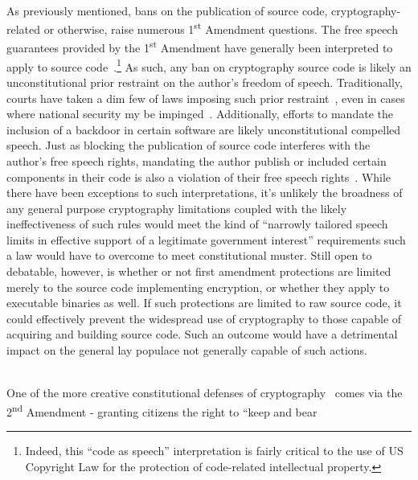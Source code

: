 \begin{packed_desc}
\item[1\textsuperscript{st} Amendment] \hfill \\ As previously
  mentioned, bans on the publication of source code,
  cryptography-related or otherwise, raise numerous
  1\textsuperscript{st} Amendment questions. The free speech
  guarantees provided by the 1\textsuperscript{st} Amendment have
  generally been interpreted to apply to source
  code~\cite{ninthcir-bernstein, sixthcir-junger}.\footnote{Indeed,
    this ``code as speech'' interpretation is fairly critical to the
    use of US Copyright Law for the protection of code-related
    intellectual property.} As such, any ban on cryptography source
  code is likely an unconstitutional prior restraint on the author's
  freedom of speech. Traditionally, courts have taken a dim few of
  laws imposing such prior restraint~\cite{scotus-nearvminnesota},
  even in cases where national security my be
  impinged~\cite{scotus-nytvus}. Additionally, efforts to mandate the
  inclusion of a backdoor in certain software are likely
  unconstitutional compelled speech. Just as blocking the publication
  of source code interferes with the author's free speech rights,
  mandating the author publish or included certain components in their
  code is also a violation of their free speech
  rights~\cite{scotus-wooleyvmaynard}. While there have been
  exceptions to such interpretations, it's unlikely the broadness of
  any general purpose cryptography limitations coupled with the likely
  ineffectiveness of such rules would meet the kind of ``narrowly
  tailored speech limits in effective support of a legitimate
  government interest'' requirements such a law would have to overcome
  to meet constitutional muster. Still open to debatable, however, is
  whether or not first amendment protections are limited merely to the
  source code implementing encryption, or whether they apply to
  executable binaries as well. If such protections are limited to raw
  source code, it could effectively prevent the widespread use of
  cryptography to those capable of acquiring and building source
  code. Such an outcome would have a detrimental impact on the general
  lay populace not generally capable of such actions.
\item[2\textsuperscript{nd} Amendment] \hfill \\ One of the more
  creative constitutional defenses of cryptography~\cite{xkcd-504}
  comes via the 2\textsuperscript{nd} Amendment - granting citizens
  the right to ``keep and bear

\end{packed_desc}
